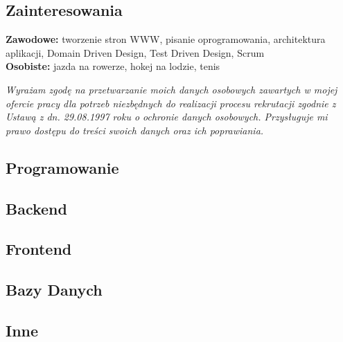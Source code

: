 \documentclass[]{friggeri-cv} %
\begin{document}
	\begin{absolutelynopagebreak}
		\section{Zainteresowania}
		\textbf{Zawodowe: } tworzenie stron WWW, pisanie oprogramowania, architektura aplikacji, Domain Driven Design, Test Driven Design, Scrum\\
		\textbf{Osobiste: } jazda na rowerze, hokej na lodzie, tenis
	\end{absolutelynopagebreak}
	
	\vfill
	\textit{Wyrażam zgodę na przetwarzanie moich danych osobowych zawartych w mojej ofercie pracy dla potrzeb niezbędnych do realizacji procesu rekrutacji zgodnie z Ustawą z dn. 29.08.1997 roku o ochronie danych osobowych. Przysługuje mi prawo dostępu do treści swoich danych oraz ich poprawiania.}
	
	\begin{pside}
		\section{Programowanie}
		\subsection{Backend}
		
		\subsection{Frontend}
		
		\subsection{Bazy Danych}
		
		\subsection{Inne}
	\end{pside}
\end{document}

